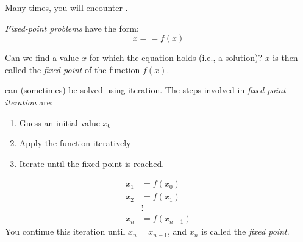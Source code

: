 Many times, you will encounter .
\begin{definition}\label{def:Fixed-Point_Problems}
  \emph{Fixed-point problems} have the form:
  \begin{equation}\label{eq:Fixed-Point_Problems}
    x == f(x)
  \end{equation}

  Can we find a value $x$ for which the equation holds (i.e., a solution)?
  $x$ is then called the \emph{fixed point} of the function $f(x)$.

   can (sometimes) be solved using iteration.
  The steps involved in \emph{fixed-point iteration} are:
  \begin{enumerate}[noitemsep]
  \item Guess an initial value $x_{0}$
  \item Apply the function iteratively
  \item Iterate until the fixed point is reached.
  \end{enumerate}
  \begin{align*}
    x_{1} &= f(x_{0}) \\
    x_{2} &= f(x_{1}) \\
    & \vdots \\
    x_{n} &= f(x_{n-1})
  \end{align*}
  You continue this iteration until $x_{n} = x_{n-1}$, and $x_{n}$ is called the \emph{fixed point}.
\end{definition}

